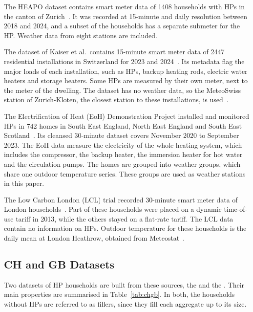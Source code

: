 The HEAPO dataset contains smart meter data of \num{1408} households with HPs in the canton of Zurich~\cite{brudermueller2025heapo}. It was recorded at 15-minute and daily resolution between 2018 and 2024, and a subset of the households has a separate submeter for the HP. Weather data from eight stations are included.

The dataset of Kaiser et al.\ contains 15-minute smart meter data of \num{2447} residential installations in Switzerland for 2023 and 2024~\cite{kaiser2026swiss}. Its metadata flag the major loads of each installation, such as HPs, backup heating rods, electric water heaters and storage heaters. Some HPs are measured by their own meter, next to the meter of the dwelling. The dataset has no weather data, so the MeteoSwiss station of Zurich-Kloten, the closest station to these installations, is used~\cite{kaiser2026swiss}.

The Electrification of Heat (EoH) Demonstration Project installed and monitored HPs in 742 homes in South East England, North East England and South East Scotland~\cite{esc2024eoh}. Its cleansed 30-minute dataset covers November 2020 to September 2023. The EoH data measure the electricity of the whole heating system, which includes the compressor, the backup heater, the immersion heater for hot water and the circulation pumps. The homes are grouped into weather groups, which share one outdoor temperature series. These groups are used as weather stations in this paper.

The Low Carbon London (LCL) trial recorded 30-minute smart meter data of London households~\cite{schofield2015lcl}. Part of these households were placed on a dynamic time-of-use tariff in 2013, while the others stayed on a flat-rate tariff. The LCL data contain no information on HPs. Outdoor temperature for these households is the daily mean at London Heathrow, obtained from Meteostat~\cite{meteostat}.

\subsection{CH and GB Datasets}
\label{sec:chgb}

Two datasets of HP households are built from these sources, the \dataCH{} and the \dataGB. Their main properties are summarised in Table~\ref{tab:chgb}. In both, the households without HPs are referred to as fillers, since they fill each aggregate up to its size.

